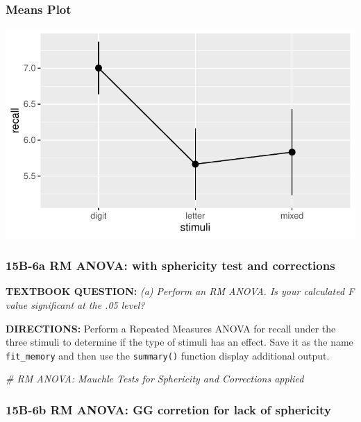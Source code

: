 \documentclass[
]{article}
\newenvironment{Shaded}{\begin{snugshade}}{\end{snugshade}}
\newcommand{\CommentTok}[1]{\textcolor[rgb]{0.56,0.35,0.01}{\textit{#1}}}
\begin{document}
\hypertarget{means-plot-2}{%
\subsubsection{Means Plot}\label{means-plot-2}}

\begin{center}\includegraphics{Chapter-15-Assignment-R-Skeleton--2020spring_files/figure-latex/unnamed-chunk-33-1} \end{center}

\clearpage

\hypertarget{b-6a-rm-anova-with-sphericity-test-and-corrections}{%
\subsubsection{15B-6a RM ANOVA: with sphericity test and
corrections}\label{b-6a-rm-anova-with-sphericity-test-and-corrections}}

\textbf{TEXTBOOK QUESTION:} \emph{(a) Perform an RM ANOVA. Is your
calculated F value significant at the .05 level?}

\textbf{DIRECTIONS:} Perform a Repeated Measures ANOVA for recall under
the three stimuli to determine if the type of stimuli has an effect.
Save it as the name \texttt{fit\_memory} and then use the
\texttt{summary()} function display additional output.

\begin{Shaded}
\begin{Highlighting}[]
\CommentTok{# RM ANOVA: Mauchle Tests for Sphericity and Corrections applied}
\end{Highlighting}
\end{Shaded}

\clearpage

\hypertarget{b-6b-rm-anova-gg-corretion-for-lack-of-sphericity}{%
\subsubsection{15B-6b RM ANOVA: GG corretion for lack of
sphericity}\label{b-6b-rm-anova-gg-corretion-for-lack-of-sphericity}}
\end{document}
